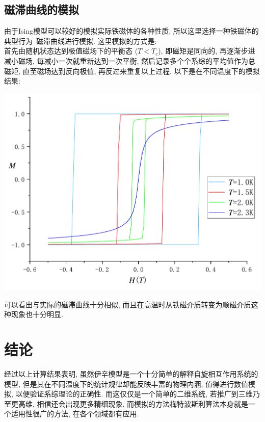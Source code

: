 \documentclass[UTF8]{ctexart}
\begin{document}
        \subsection{磁滞曲线的模拟}
            \indent 由于Ising模型可以较好的模拟实际铁磁体的各种性质, 所以这里选择一种铁磁体的典型行为--磁滞曲线进行模拟.
            这里模拟的方式是:\\
            \indent 首先由随机状态达到极值磁场下的平衡态 ($T<T_c$), 即磁矩是同向的, 再逐渐步进减小磁场, 每减小一次就重新达到一次平衡, 然后记录多个个系综的平均值作为总磁矩,
            直至磁场达到反向极值, 再反过来重复以上过程. 以下是在不同温度下的模拟结果:
            \begin{center}
                \includegraphics[width=17cm]{HysteresisCurve.pdf}
            \end{center}
            可以看出与实际的磁滞曲线十分相似, 而且在高温时从铁磁介质转变为顺磁介质这种现象也十分明显.
    \section{结论}
        \indent 经过以上计算结果表明, 虽然伊辛模型是一个十分简单的解释自旋相互作用系统的模型, 但是其在不同温度下的统计规律却能反映丰富的物理内涵, 值得进行数值模拟, 以便验证系综理论的正确性.
        而这仅仅是一个简单的二维系统, 若推广到三维乃至更高维, 相信还会出现更多精细现象. 而模拟的方法梅特波斯利算法本身就是一个适用性很广的方法, 在各个领域都有应用.
\end{document}
